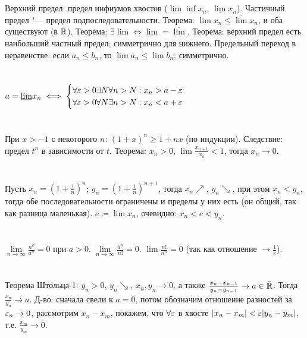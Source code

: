 \section{} %
Верхний предел: предел инфиумов хвостов ($\lim \inf x_n$, $\underline \lim x_n$).
Частичный предел "--- предел подпоследовательности. Теорема: $\underline\lim x_n \le \overline\lim x_n$,
и оба существуют (в $\bar{\mathbb{R}}$). Теорема: $\exists \lim \iff \underline\lim = \overline\lim$.
Теорема: верхний предел есть наибольший частный предел; симметрично для нижнего.
Предельный переход в неравенстве: если $a_n\le b_n$, то $\underline\lim a_n \le \underline\lim b_n$;
симметрично.

\section{} %
$
a = \underline\lim x_n \iff
\begin{cases}
\forall \varepsilon > 0 \exists N \forall n > N: x_n > a -\varepsilon \\
\forall \varepsilon > 0 \forall N \exists n > N: x_n < a +\varepsilon \\
\end{cases}
$

\section{} %
При $x > -1$ с некоторого $n$: $(1+x)^n\ge 1 + nx$ (по индукции). Следствие: предел $t^n$
в зависимости от $t$. Теорема: $x_n>0$, $\lim \frac{x_{n+1}}{x_n} < 1$, тогда $x_n \to 0$.

\section{} %
Пусть $x_n=\left(1+\frac1n\right)^n$; $y_n=\left(1+\frac1n\right)^{n+1}$, тогда $x_n\nearrow$, $y_n\searrow$,
при этом $x_n<y_n$, тогда обе последовательности ограничены и пределы у них есть (он общий, так как разница
маленькая). $e \coloneqq \lim x_n$, очевидно: $x_n < e < y_n$.

\section{} %
$\lim\limits_{n\to\infty} \frac{n^k}{a^n} = 0$ при $a>0$.
$\lim\limits_{n\to\infty} \frac{a^n}{n!}=0$.
$\lim \frac{n!}{n^n} = 0$ (так как отношение $\to \frac 1 e$).

\section{} %
Теорема Штольца-1: $y_n>0$, $y_n\searrow$, $x_n, y_n \to 0$, а также $\frac{x_n-x_{n-1}}{y_n-y_{n-1}} \to a \in \bar{\mathbb{R}}$.
Тогда $\frac{x_n}{y_n} \to a$. Д-во: сначала свели к $a=0$, потом обозначим отношение разностей за $\varepsilon_n \to 0$, рассмотрим $x_n-x_m$, покажем,
что $\forall\varepsilon$ в хвосте $|x_n-x_m|<\varepsilon |y_n-y_m|$, т.е. $\frac{x_m}{y_m} \to 0$.

